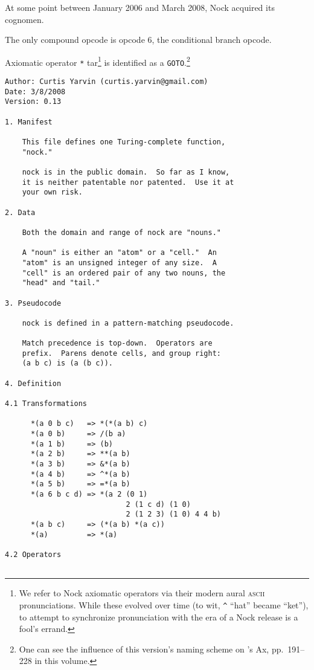 \documentclass[twoside]{article}
\begin{document}
At some point between January 2006 and March 2008, Nock acquired its cognomen.

The only compound opcode is opcode 6, the conditional branch opcode.

Axiomatic operator \texttt{*} tar\footnote{We refer to Nock axiomatic operators via their modern aural \textsc{ascii} pronunciations.  While these evolved over time (to wit, \texttt{\textasciicircum} ``hat'' became ``ket''), to attempt to synchronize pronunciation with the era of a Nock release is a fool's errand.} is identified as a \texttt{GOTO}.\footnote{One can see the influence of this version's naming scheme on 's Ax, pp.~191–228 in this volume.}
 
\begin{lstlisting}[label=lst:nock13k,caption={Nock 13K, 8 March 2008.},style=listingcode]
Author: Curtis Yarvin (curtis.yarvin@gmail.com)
Date: 3/8/2008
Version: 0.13

1. Manifest

    This file defines one Turing-complete function,
    "nock."

    nock is in the public domain.  So far as I know,
    it is neither patentable nor patented.  Use it at
    your own risk.

2. Data

    Both the domain and range of nock are "nouns."

    A "noun" is either an "atom" or a "cell."  An
    "atom" is an unsigned integer of any size.  A
    "cell" is an ordered pair of any two nouns, the
    "head" and "tail."

3. Pseudocode

    nock is defined in a pattern-matching pseudocode.

    Match precedence is top-down.  Operators are
    prefix.  Parens denote cells, and group right:
    (a b c) is (a (b c)).

4. Definition

4.1 Transformations

      *(a 0 b c)   => *(*(a b) c)
      *(a 0 b)     => /(b a)
      *(a 1 b)     => (b)
      *(a 2 b)     => **(a b)
      *(a 3 b)     => &*(a b)
      *(a 4 b)     => ^*(a b)
      *(a 5 b)     => =*(a b)
      *(a 6 b c d) => *(a 2 (0 1)
                            2 (1 c d) (1 0)
                            2 (1 2 3) (1 0) 4 4 b)
      *(a b c)     => (*(a b) *(a c))
      *(a)         => *(a)

4.2 Operators


\end{lstlisting}
\end{document}
